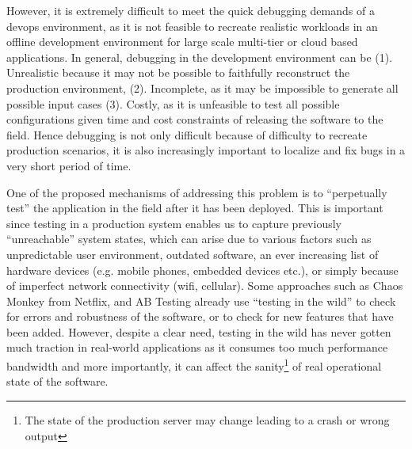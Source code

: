 However, it is extremely difficult to meet the quick debugging demands of a devops environment, as it is not feasible to recreate realistic workloads in an offline development environment for large scale multi-tier or cloud based applications.
In general, debugging in the development environment can be (1). Unrealistic because it may not be possible to faithfully reconstruct the production environment, (2). Incomplete, as it may be impossible to generate all possible input cases (3). Costly, as it is unfeasible to test all possible configurations given time and cost constraints of releasing the software to the field. 
Hence debugging is not only difficult because of difficulty to recreate production scenarios, it is also increasingly important to localize and fix bugs in a very short period of time.

One of the proposed mechanisms of addressing this problem is to ``perpetually test''\cite{perpetual} the application in the field after it has been deployed. 
This is important since testing in a production system enables us to capture previously ``unreachable'' system states, which can arise due to various factors such as unpredictable user environment, outdated software, an ever increasing list of hardware devices (e.g. mobile phones, embedded devices etc.), or simply because of imperfect network connectivity (wifi, cellular).
Some approaches such as Chaos Monkey\cite{chaosmonkey} from Netflix, and AB Testing\cite{abtesting} already use ``testing in the wild'' to check for errors and robustness of the software, or to check for new features that have been added.  
However, despite a clear need, testing in the wild has never gotten much traction in real-world applications as it consumes too much performance bandwidth and more importantly, it can affect the sanity\footnote{The state of the production server may change leading to a crash or wrong output} of real operational state of the software.

